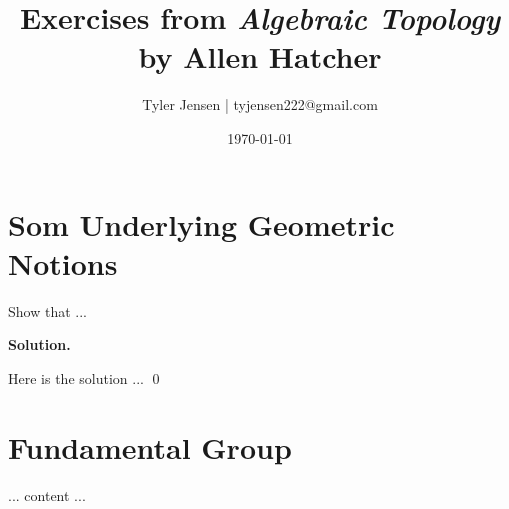 \documentclass[12pt]{book}
\title{Exercises from \textit{Algebraic Topology} \\
       by Allen Hatcher}
\author{Tyler Jensen | tyjensen222@gmail.com}
\date{\today}
\theoremstyle{definition}
\newenvironment{solution}
{%
  \par\noindent\textbf{Solution.}\quad
}
{%
  \qed\par
}
\begin{document}
\frontmatter
\maketitle
\tableofcontents

\mainmatter

\setcounter{chapter}{-1}

\chapter{Som Underlying Geometric Notions}


\begin{taggedexercise}[\textcolor{red}{TODO}]
  Show that ...
\end{taggedexercise}

\begin{solution}
  Here is the solution ...
\end{solution}

\chapter{Fundamental Group}

... content ...
\end{document}
